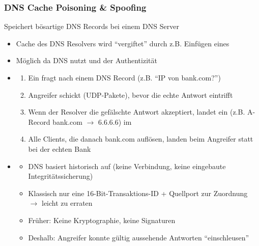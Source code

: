 \subsubsection*{DNS Cache Poisoning \& Spoofing}
 Speichert bösartige DNS Records bei einem DNS Server 
\begin{itemize}
    \item Cache des DNS Resolvers wird \enquote{vergiftet} durch z.B. Einfügen eines 
    \item Möglich da DNS  nutzt und  der Authentizität
\end{itemize}
\begin{infoBox}
    \begin{itemize}
        \item {}
        \begin{enumerate}
            \item Ein  fragt nach einem DNS Record (z.B. \enquote{IP von bank.com?})
            \item Angreifer schickt  (UDP-Pakete), bevor die echte Antwort eintrifft
            \item Wenn der Resolver die gefälschte Antwort akzeptiert, landet ein  (z.B. A-Record bank.com $\rightarrow$ 6.6.6.6) im 
            \item Alle Clients, die danach bank.com auflösen, landen beim Angreifer statt bei der echten Bank
        \end{enumerate}
        \item {}
        \begin{itemize}
            \item DNS basiert historisch auf  (keine Verbindung, keine eingebaute Integritätssicherung)
            \item Klassisch nur eine 16-Bit-Transaktions-ID + Quellport zur Zuordnung $\rightarrow$ leicht zu erraten
            \item Früher: Keine Kryptographie, keine Signaturen
            \item Deshalb: Angreifer konnte gültig aussehende Antworten \enquote{einschleusen}
        \end{itemize}
    \end{itemize}
\end{infoBox}
